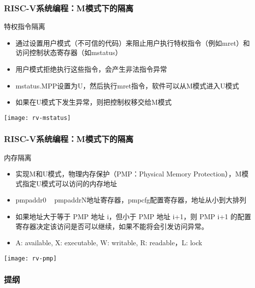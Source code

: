 \begin{frame}
    \frametitle{RISC-V系统编程：M模式下的隔离}
    特权指令隔离
    \begin{itemize}
        \item 通过设置用户模式（不可信的代码）来阻止用户执行特权指令（例如mret）和访问控制状态寄存器（如mstatus）
        \item 用户模式拒绝执行这些指令，会产生非法指令异常
        \item mstatus.MPP设置为U，然后执行mret指令，软件可以从M模式进入U模式
        \item 如果在U模式下发生异常，则把控制权移交给M模式
        
    \end{itemize}
    
    \centering
    \texttt{[image: rv-mstatus]}
    
\end{frame}


\begin{frame}
    \frametitle{RISC-V系统编程：M模式下的隔离}
    内存隔离
    \begin{itemize}
        \item 实现M和U模式，物理内存保护（PMP：Physical Memory Protection），M模式指定U模式可以访问的内存地址
        \item pmpaddr0 ~ pmpaddrN地址寄存器，pmpcfg配置寄存器，地址从小到大排列
        \item 如果地址大于等于 PMP 地址 i，但小于 PMP 地址 i+1，则 PMP i+1 的配置寄存器决定该访问是否可以继续，如果不能将会引发访问异常。
        \item A: available, X: executable, W: writable, R: readable，L: lock
        
    \end{itemize}
    
    \centering
    \texttt{[image: rv-pmp]}
    
\end{frame}
\begin{frame}
    \frametitle{提纲} 
    \tableofcontents 
\end{frame}


